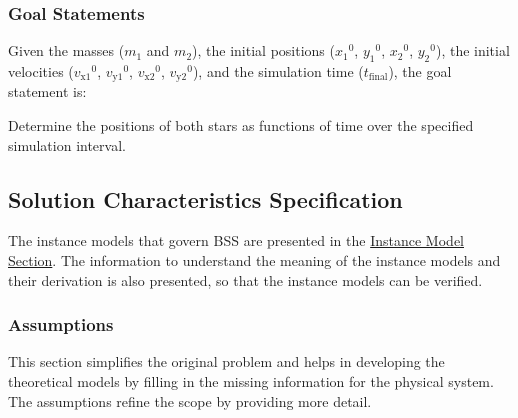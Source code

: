 \documentclass[12pt]{article}
\begin{document}
\subsubsection{Goal Statements}
\label{Sec:GoalStmt}
Given the masses (${m_{1}}$ and ${m_{2}}$), the initial positions (${{x_{1}}^{0}}$, ${{y_{1}}^{0}}$, ${{x_{2}}^{0}}$, ${{y_{2}}^{0}}$), the initial velocities (${{v_{\text{x}1}}^{0}}$, ${{v_{\text{y}1}}^{0}}$, ${{v_{\text{x}2}}^{0}}$, ${{v_{\text{y}2}}^{0}}$), and the simulation time (${t_{\text{final}}}$), the goal statement is:

\begin{description}[font=\normalfont]
\item[positionsOverTime:\phantomsection\label{positionsOverTime}]{Determine the positions of both stars as functions of time over the specified simulation interval.}
\end{description}
\subsection{Solution Characteristics Specification}
\label{Sec:SolCharSpec}
The instance models that govern BSS are presented in the \hyperref[Sec:IMs]{Instance Model Section}. The information to understand the meaning of the instance models and their derivation is also presented, so that the instance models can be verified.

\subsubsection{Assumptions}
\label{Sec:Assumps}
This section simplifies the original problem and helps in developing the theoretical models by filling in the missing information for the physical system. The assumptions refine the scope by providing more detail.
\end{document}
